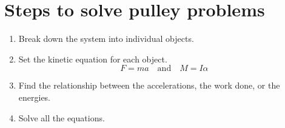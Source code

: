 \documentclass[11pt]{article}
\begin{document}
\section{Steps to solve pulley problems}
\label{sec:org892e22f}
\begin{enumerate}
\item Break down the system into individual objects.
\item Set the kinetic equation for each object.
\[F = ma \quad \text{and} \quad M = I \alpha\]
\item Find the relationship between the accelerations, the work done, or the energies.
\item Solve all the equations.
\end{enumerate}
\end{document}
